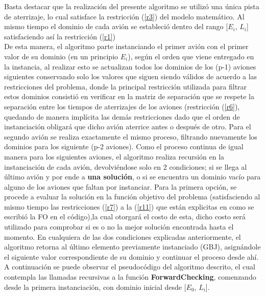 \documentclass[letter, 10pt]{article}
\begin{document}
Basta destacar que la realización del presente algoritmo se utilizó una única pista de aterrizaje, lo cual satisface la restricción (\ref{r3}) del modelo matemático. Al mismo tiempo el dominio de cada avión se estableció dentro del rango [$E_i$, $L_i$] satisfaciendo así la restricción (\ref{r1}) \\
De esta manera, el algoritmo parte instanciando el primer avión con el primer valor de su dominio (en un principio $E_i$), según el orden que viene entregado en la instancia, al realizar esto se actualizan todos los dominios de los (p-1) aviones siguientes conservando solo los valores que siguen siendo válidos de acuerdo a las restricciones del problema, donde la principal restricción utilizada para filtrar estos dominios consistió en verificar en la matriz de separación que se respete la separación entre los tiempos de aterrizajes de los aviones (restricción (\ref{r6}), quedando de manera implícita las demás restricciones dado que el orden de instanciación obligará que dicho avión aterrice antes o después de otro. Para el segundo avión se realiza exactamente el mismo proceso, filtrando nuevamente los dominios para los siguiente (p-2 aviones). Como el proceso continua de igual manera para los siguientes aviones, el algoritmo realiza recursión en la instanciación de cada avión, devolviéndose solo en 2 condiciones; si se llega al último avión y por ende a \textbf{una solución}, o  si se encuentra un dominio vacío para alguno de los aviones que faltan por instanciar. Para la primera opción, se procede a evaluar la solución en la función objetivo del problema (satisfaciendo al mismo tiempo las restricciones (\ref{r7}) a la (\ref{r11}) que están explicitas en como se escribió la FO en el código),la cual otorgará el costo de esta, dicho costo será utilizado para comprobar si es o no la mejor solución encontrada hasta el momento. En cualquiera de las dos condiciones explicadas anteriormente, el algoritmo retorna al último elemento previamente instanciado (GBJ), asignándole el siguiente valor correspondiente de su dominio y continuar el proceso desde ahí.\\

A continuación se puede observar el pseudocódigo del algoritmo descrito, el cual contempla las llamadas recursivas a la función \textbf{ForwardChecking}, comenzando desde la primera instanciación, con dominio inicial desde [$E_0$, $L_i$].\\
\end{document}
